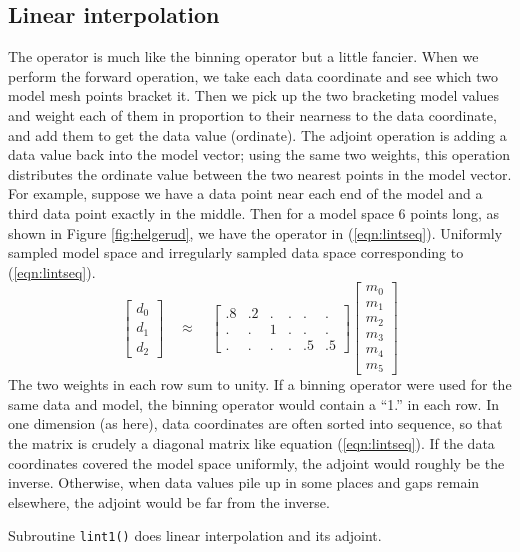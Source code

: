 \subsection{Linear interpolation}
\par
The 
operator is much like the binning operator but a little fancier.
When we perform the forward operation, we take each data coordinate
and see which two model mesh points bracket it.
Then we pick up the two bracketing model values
and weight each of them
in proportion to their nearness to the data coordinate,
and add them to get the data value (ordinate).
The adjoint operation is adding a data value
back into the model vector;
using the same two weights,
this operation distributes the ordinate value
between the two nearest points in the model vector.
For example, suppose we have a data point near each end of the model
and a third data point exactly in the middle.
Then for a model space 6 points long,
as shown in Figure \ref{fig:helgerud},
we have the operator in (\ref{eqn:lintseq}).
 {
  Uniformly sampled model space
  and irregularly sampled data space corresponding
  to \protect(\ref{eqn:lintseq}).
}
\begin{equation}
\left[ 
\begin{array}{c}
  d_0 \\ 
  d_1 \\ 
  d_2 
  \end{array} \right] 
\quad \approx \quad
\left[ 
\begin{array}{rrrrrr}
   .8 & .2 &  .  & .  & .  & .  \\
   .  & .  &  1  & .  & .  & .  \\
   .  & .  &  .  & .  & .5 & .5 
  \end{array} \right] 
\left[ 
	\begin{array}{c}
	  m_0 \\ 
	  m_1 \\ 
	  m_2 \\ 
	  m_3 \\ 
	  m_4 \\ 
	  m_5
	\end{array}
\right] 
\label{eqn:lintseq}
\end{equation}
The two weights in each row sum to unity.
If a binning operator were used for the same data and model,
the binning operator would contain a ``1.'' in each row.
In one dimension (as here),
data coordinates are often sorted into sequence,
so that the matrix is crudely a diagonal matrix like equation (\ref{eqn:lintseq}).
If the data coordinates covered the model space uniformly,
the adjoint would roughly be the inverse.
Otherwise,
when data values pile up in some places and gaps remain elsewhere,
the adjoint would be far from the inverse.
\par
Subroutine \texttt{lint1()} does linear interpolation and its adjoint.


